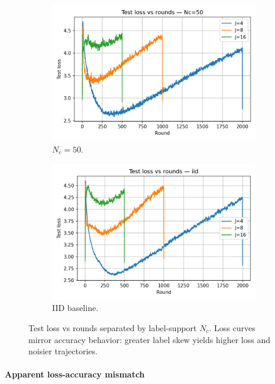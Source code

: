 \documentclass[10pt,twocolumn,letterpaper]{article}
\begin{document}
\begin{figure}[H]
  \begin{subfigure}[b]{0.48\linewidth}
    \centering
    \includegraphics[width=\linewidth]{heter_figs/loss_vs_rounds_Nc_50.png}
    \caption{\(N_c=50\).}
  \end{subfigure}
  \hfill
  \begin{subfigure}[b]{0.48\linewidth}
    \centering
    \includegraphics[width=\linewidth]{heter_figs/loss_vs_rounds_iid.png}
    \caption{IID baseline.}
  \end{subfigure}

  \caption{Test loss vs rounds separated by label-support \(N_c\). Loss curves mirror accuracy behavior: greater label skew yields higher loss and noisier trajectories.}
  \label{fig:hetero-loss-perNc}
\end{figure}


\paragraph { Apparent loss-accuracy mismatch}
\label{sec:loss-acc-mismatch}
\end{document}
